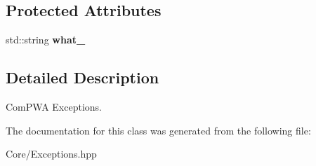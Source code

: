 \subsection*{Protected Attributes}
\begin{DoxyCompactItemize}
\item 
\hypertarget{class_exception_a4dad5e3141a31867ef43fd3ccb5e147d}{std\-::string {\bfseries what\-\_\-}}\label{class_exception_a4dad5e3141a31867ef43fd3ccb5e147d}

\end{DoxyCompactItemize}


\subsection{Detailed Description}
Com\-P\-W\-A Exceptions. 

The documentation for this class was generated from the following file\-:\begin{DoxyCompactItemize}
\item 
Core/Exceptions.\-hpp\end{DoxyCompactItemize}
